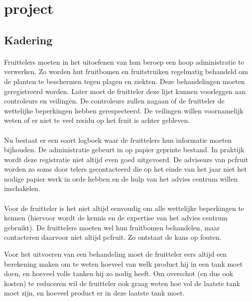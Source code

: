 \section {project}

\subsection {Kadering}

\paragraph {} Fruittelers moeten in het uitoefenen van hun beroep een hoop administratie
te verwerken. Zo worden hut fruitbomen en fruitstruiken regelmatig behandeld om de planten
te beschermen tegen plagen en ziekten. Deze behandelingen moeten geregistreerd worden.
Later moet de fruitteler deze lijst kunnen voorleggen aan controleurs en veilingen. De
controleurs zullen nagaan of de fruitteler de wettelijke beperkingen hebben gerespecteerd.
De veilingen willen voornamelijk weten of er niet te veel residu op het fruit is achter
gebleven.

\paragraph {} Nu bestaat er een soort logboek waar de fruittelers hun informatie moeten
bijhouden. De administratie gebeurt in op papier geprinte bestand. In praktijk wordt deze
registratie niet altijd even goed uitgevoerd. De adviseurs van pcfruit worden zo soms door
telers gecontacteerd die op het einde van het jaar niet het nodige papier werk in orde
hebben en de hulp van het advies centrum willen inschakelen.

\paragraph {} Voor de fruitteler is het niet altijd eenvoudig om alle wettelijke
beperkingen te kennen (hiervoor wordt de kennis en de expertise van het advies centrum
gebruikt). De fruittelers moeten wel hun fruitbomen behandelen, maar contacteren daarvoor
niet altijd pcfruit. Zo ontstaat de kans op fouten.

Voor het uitvoeren van een behandeling moet de fruitteler eers altijd een berekening maken om
te weten hoeveel van welk product hij in een tank moet doen, en hoeveel volle tanken hij
zo nodig heeft. Om overschot (en dus ook kosten) te reduceren wil de fruitteler ook graag weten
hoe vol de laatste tank moet zijn, en hoeveel product er in deze laatste tank moet.

